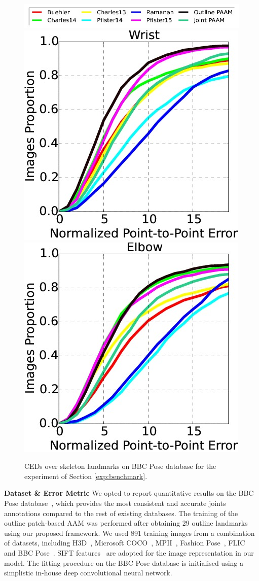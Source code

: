 \begin{figure}[b!]
    \centering
    \includegraphics[width=\columnwidth]{resources/Annotation_Correction/HandBenchmark/legend}
    \\
    \includegraphics[width=0.48\columnwidth]{resources/Annotation_Correction/HandBenchmark/wrist}
    \includegraphics[width=0.48\columnwidth]{resources/Annotation_Correction/HandBenchmark/elbow}
    \caption{CEDs over skeleton landmarks on BBC Pose database for the experiment of Section  \ref{exp:benchmark}.}
    \label{fig:hand_benchmark}
\end{figure}


\noindent\textbf{Dataset \& Error Metric} We opted to report quantitative results on the BBC Pose database~\cite{pfister2015flowing}, which provides the most consistent and accurate joints annotations compared to the rest of existing databases. The training of the outline patch-based AAM was performed after obtaining 29 outline landmarks using our proposed framework. We used 891 training images from a combination of datasets, including H3D~\cite{PoseletsICCV09}, Microsoft COCO~\cite{lin2014microsoft}, MPII~\cite{andriluka14cvpr}, Fashion Pose~\cite{dantone2013human}, FLIC~\cite{sapp2013modec} and BBC Pose~\cite{pfister2015flowing}. SIFT features~\cite{PoseletsICCV09} are adopted for the image representation in our model. The fitting procedure on the BBC Pose database is initialised using a simplistic in-house deep convolutional neural network.

